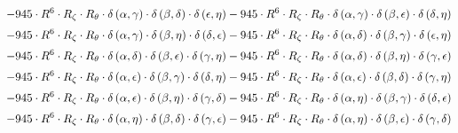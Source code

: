 \begin{subequations}
\begin{gather}
 \\[0.2em] \notag 		 - 945 \cdot R^{6} \cdot R_{\zeta{}} \cdot R_{\theta{}} \cdot \delta{}\left(\alpha{}, \gamma{}\right) \cdot \delta{}\left(\beta{}, \delta{}\right) \cdot \delta{}\left(\epsilon{}, \eta{}\right)- 945 \cdot R^{6} \cdot R_{\zeta{}} \cdot R_{\theta{}} \cdot \delta{}\left(\alpha{}, \gamma{}\right) \cdot \delta{}\left(\beta{}, \epsilon{}\right) \cdot \delta{}\left(\delta{}, \eta{}\right) 
 \\[0.2em] \notag 		 - 945 \cdot R^{6} \cdot R_{\zeta{}} \cdot R_{\theta{}} \cdot \delta{}\left(\alpha{}, \gamma{}\right) \cdot \delta{}\left(\beta{}, \eta{}\right) \cdot \delta{}\left(\delta{}, \epsilon{}\right)- 945 \cdot R^{6} \cdot R_{\zeta{}} \cdot R_{\theta{}} \cdot \delta{}\left(\alpha{}, \delta{}\right) \cdot \delta{}\left(\beta{}, \gamma{}\right) \cdot \delta{}\left(\epsilon{}, \eta{}\right) 
 \\[0.2em] \notag 		 - 945 \cdot R^{6} \cdot R_{\zeta{}} \cdot R_{\theta{}} \cdot \delta{}\left(\alpha{}, \delta{}\right) \cdot \delta{}\left(\beta{}, \epsilon{}\right) \cdot \delta{}\left(\gamma{}, \eta{}\right)- 945 \cdot R^{6} \cdot R_{\zeta{}} \cdot R_{\theta{}} \cdot \delta{}\left(\alpha{}, \delta{}\right) \cdot \delta{}\left(\beta{}, \eta{}\right) \cdot \delta{}\left(\gamma{}, \epsilon{}\right) 
 \\[0.2em] \notag 		 - 945 \cdot R^{6} \cdot R_{\zeta{}} \cdot R_{\theta{}} \cdot \delta{}\left(\alpha{}, \epsilon{}\right) \cdot \delta{}\left(\beta{}, \gamma{}\right) \cdot \delta{}\left(\delta{}, \eta{}\right)- 945 \cdot R^{6} \cdot R_{\zeta{}} \cdot R_{\theta{}} \cdot \delta{}\left(\alpha{}, \epsilon{}\right) \cdot \delta{}\left(\beta{}, \delta{}\right) \cdot \delta{}\left(\gamma{}, \eta{}\right) 
 \\[0.2em] \notag 		 - 945 \cdot R^{6} \cdot R_{\zeta{}} \cdot R_{\theta{}} \cdot \delta{}\left(\alpha{}, \epsilon{}\right) \cdot \delta{}\left(\beta{}, \eta{}\right) \cdot \delta{}\left(\gamma{}, \delta{}\right)- 945 \cdot R^{6} \cdot R_{\zeta{}} \cdot R_{\theta{}} \cdot \delta{}\left(\alpha{}, \eta{}\right) \cdot \delta{}\left(\beta{}, \gamma{}\right) \cdot \delta{}\left(\delta{}, \epsilon{}\right) 
 \\[0.2em] \notag 		 - 945 \cdot R^{6} \cdot R_{\zeta{}} \cdot R_{\theta{}} \cdot \delta{}\left(\alpha{}, \eta{}\right) \cdot \delta{}\left(\beta{}, \delta{}\right) \cdot \delta{}\left(\gamma{}, \epsilon{}\right)- 945 \cdot R^{6} \cdot R_{\zeta{}} \cdot R_{\theta{}} \cdot \delta{}\left(\alpha{}, \eta{}\right) \cdot \delta{}\left(\beta{}, \epsilon{}\right) \cdot \delta{}\left(\gamma{}, \delta{}\right) 

\end{gather}
\end{subequations}
